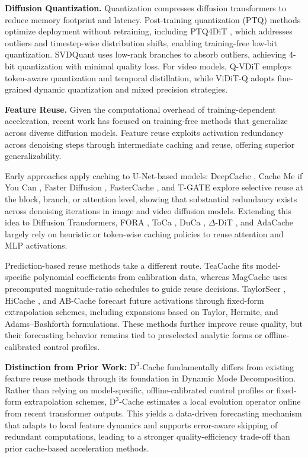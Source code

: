 \textbf{Diffusion Quantization.}
Quantization compresses diffusion transformers
to reduce memory footprint and latency.
Post-training quantization (PTQ) methods
optimize deployment without retraining,
including PTQ4DiT \cite{wu2024ptq4dit},
which addresses outliers and timestep-wise distribution shifts,
enabling training-free low-bit quantization.
SVDQuant \cite{li2024svdquant}
uses low-rank branches to absorb outliers,
achieving 4-bit quantization with minimal quality loss.
For video models,
Q-VDiT \cite{feng2025q}
employs token-aware quantization and temporal distillation,
while ViDiT-Q \cite{zhao2024viditq}
adopts fine-grained dynamic quantization and mixed precision strategies.

\textbf{Feature Reuse.}
Given the computational overhead of training-dependent acceleration,
recent work has focused on training-free methods
that generalize across diverse diffusion models.
Feature reuse exploits activation redundancy across denoising steps
through intermediate caching and reuse,
offering superior generalizability.

Early approaches apply caching to U-Net-based models:
DeepCache \cite{Xu_2018},
Cache Me if You Can \cite{wimbauer2024cachecanacceleratingdiffusion},
Faster Diffusion \cite{li2024faster},
FasterCache \cite{lv2024fastercache},
and T-GATE \cite{tgate}
explore selective reuse at the block, branch, or attention level,
showing that substantial redundancy exists
across denoising iterations in image and video diffusion models.
Extending this idea to Diffusion Transformers,
FORA \cite{selvaraju2024forafastforwardcachingdiffusion},
ToCa \cite{zou2024accelerating},
DuCa \cite{zou2025rethinkingtokenwisefeaturecaching},
$\Delta$-DiT \cite{chen2024deltadittrainingfreeaccelerationmethod},
and AdaCache \cite{adacache}
largely rely on heuristic or token-wise caching policies
to reuse attention and MLP activations.

Prediction-based reuse methods take a different route.
TeaCache \cite{liu2024timestep}
fits model-specific polynomial coefficients from calibration data,
whereas MagCache \cite{ma2025magcache}
uses precomputed magnitude-ratio schedules
to guide reuse decisions.
TaylorSeer \cite{TaylorSeer2025},
HiCache \cite{feng2025hicachetrainingfreeaccelerationdiffusion},
and AB-Cache \cite{yu2025abcachetrainingfreeaccelerationdiffusion}
forecast future activations
through fixed-form extrapolation schemes,
including expansions based on Taylor, Hermite, and Adams--Bashforth formulations.
These methods further improve reuse quality,
but their forecasting behavior remains tied
to preselected analytic forms or offline-calibrated control profiles.

\textbf{Distinction from Prior Work:}
$\mathrm{D}^3$-Cache fundamentally differs from existing feature reuse methods
through its foundation in Dynamic Mode Decomposition.
Rather than relying on model-specific,
offline-calibrated control profiles
or fixed-form extrapolation schemes,
$\mathrm{D}^3$-Cache estimates a local evolution operator online
from recent transformer outputs.
This yields a data-driven forecasting mechanism
that adapts to local feature dynamics
and supports error-aware skipping of redundant computations,
leading to a stronger quality-efficiency trade-off
than prior cache-based acceleration methods.
